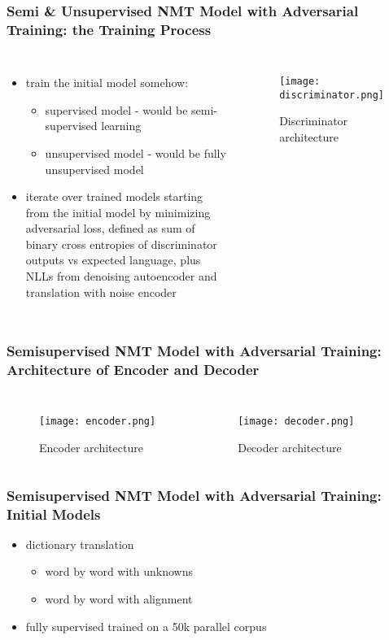 \documentclass{beamer}
\begin{document}
\begin{frame}
\frametitle{Semi \& Unsupervised NMT Model with Adversarial Training: the Training Process}

\begin{columns}
\begin{itemize}
\item train the initial model somehow:
\begin{itemize}
\item supervised model - would be semi-supervised learning
\item unsupervised model - would be fully unsupervised model
\end{itemize}
\item iterate over trained models starting from the initial model by minimizing adversarial loss, defined as sum of binary cross entropies of discriminator outputs vs expected language, plus NLLs from denoising autoencoder and translation with noise encoder
\end{itemize}
\centering
{}
\begin{figure}
\texttt{[image: discriminator.png]}
\caption{Discriminator architecture}
\end{figure}
\end{columns}

\end{frame}

\begin{frame}
\frametitle{Semisupervised NMT Model with Adversarial Training: Architecture of Encoder and Decoder}

\begin{columns}
\centering
\begin{figure}
\texttt{[image: encoder.png]}
\caption{Encoder architecture}
\end{figure}
\begin{figure}
\texttt{[image: decoder.png]}
\caption{Decoder architecture}
\end{figure}
\end{columns}
\end{frame}

\begin{frame}
\frametitle{Semisupervised NMT Model with Adversarial Training: Initial Models}

\begin{itemize}
\item dictionary translation
\begin{itemize}
\item word by word with unknowns
\item word by word with alignment
\end{itemize}
\item fully supervised trained on a 50k parallel corpus
\end{itemize}

\end{frame}
\end{document}
